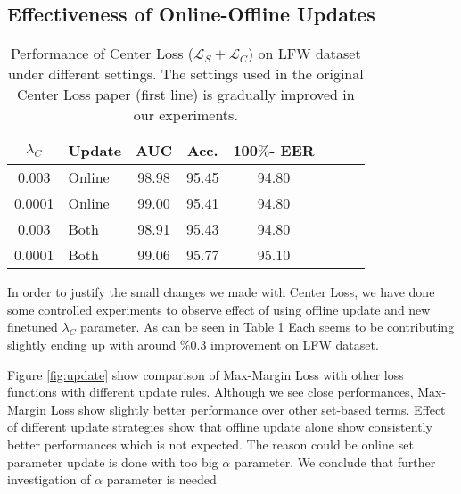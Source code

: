 \documentclass[10pt,twocolumn,letterpaper]{article}
\newcommand{\margin}{Max-Margin Loss\xspace}
\begin{document}
\subsection{Effectiveness of Online-Offline Updates}
\begin{table}
\begin{center}
\begin{tabular}{|c|l|c|c|c|c|c|c|}
\hline
 $\lambda_C$ & Update & AUC & Acc. & 100$\%$- EER \\

\hline

 0.003& Online & 98.98 &95.45 &94.80 \\
 0.0001& Online & 99.00 &95.41 &94.80 \\

 0.003& Both & 98.91
 &95.43
 &94.80 \\
 
0.0001& Both & 99.06
 &95.77
 &95.10 \\


\hline
\end{tabular}
\end{center}
\caption{Performance of Center Loss ($\mathcal{L}_S + \mathcal{L}_C$) on LFW dataset under different settings. The settings used in the original Center Loss paper \cite{wen2016discriminative} (first line) is gradually improved in our experiments.}
\label{tab:centerloss}
\end{table}

In order to justify the small changes we made with Center Loss, we have done some controlled experiments to observe effect of using offline update and new finetuned $\lambda_C$ parameter. As can be seen in Table \ref{tab:centerloss} Each seems to be contributing slightly ending up with around $\%0.3$ improvement on LFW dataset.

Figure \ref{fig:update} show comparison of \margin with other loss functions with different update rules. Although we see close performances, \margin show slightly better performance over other set-based terms. Effect of different update strategies show that offline update alone show consistently better performances which is not expected. The reason could be online set parameter update is done with too big $\alpha$ parameter. We conclude that further investigation of $\alpha$ parameter is needed
\end{document}
